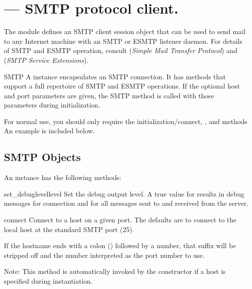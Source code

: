 \section{ ---
         SMTP protocol client.}



The  module defines an SMTP client session object that
can be used to send mail to any Internet machine with an SMTP or ESMTP
listener daemon.  For details of SMTP and ESMTP operation, consult
 (\emph{Simple Mail Transfer Protocol}) and 
(\emph{SMTP Service Extensions}).

\begin{classdesc}{SMTP}{}
A  instance encapsulates an SMTP connection.  It has
methods that support a full repertoire of SMTP and ESMTP
operations. If the optional host and port parameters are given, the
SMTP  method is called with those parameters during
initialization.

For normal use, you should only require the initialization/connect,
, and  methods  An example is
included below.
\end{classdesc}


\subsection{SMTP Objects}
\label{SMTP-objects}

An  instance has the following methods:

\begin{methoddesc}{set_debuglevel}{level}
Set the debug output level.  A true value for  results in
debug messages for connection and for all messages sent to and
received from the server.
\end{methoddesc}

\begin{methoddesc}{connect}{}
Connect to a host on a given port.  The defaults are to connect to the 
local host at the standard SMTP port (25).

If the hostname ends with a colon (\character{:}) followed by a
number, that suffix will be stripped off and the number interpreted as 
the port number to use.

Note:  This method is automatically invoked by the constructor if a
host is specified during instantiation.
\end{methoddesc}


